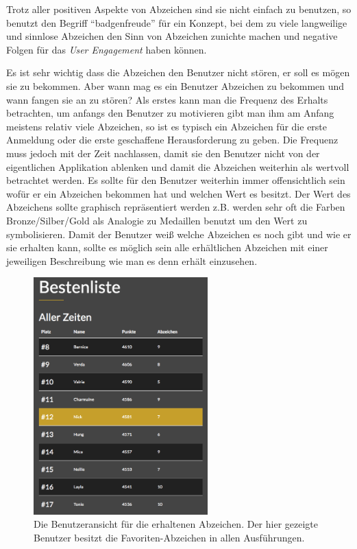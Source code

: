 \documentclass[12pt,twoside]{book}
\begin{document}
Trotz aller positiven Aspekte von Abzeichen sind sie nicht einfach zu benutzen, so benutzt \citep{zichermann2011gamification, 56} den Begriff ``badgenfreude'' für ein Konzept, bei dem zu viele langweilige und sinnlose Abzeichen den Sinn von Abzeichen zunichte machen und negative Folgen für das \textit{User Engagement} haben können.

Es ist sehr wichtig dass die Abzeichen den Benutzer nicht stören, er soll es mögen sie zu bekommen. Aber wann mag es ein Benutzer Abzeichen zu bekommen und wann fangen sie an zu stören?
Als erstes kann man die Frequenz des Erhalts betrachten, um anfangs den Benutzer zu motivieren gibt man ihm am Anfang meistens relativ viele Abzeichen, so ist es typisch ein Abzeichen für die erste Anmeldung oder die erste geschaffene Herausforderung zu geben.
Die Frequenz muss jedoch mit der Zeit nachlassen, damit sie den Benutzer nicht von der eigentlichen Applikation ablenken und damit die Abzeichen weiterhin als wertvoll betrachtet werden.
Es sollte für den Benutzer weiterhin immer offensichtlich sein wofür er ein Abzeichen bekommen hat und welchen Wert es besitzt. Der Wert des Abzeichens sollte graphisch repräsentiert werden z.B. werden sehr oft die Farben Bronze/Silber/Gold als Analogie zu Medaillen benutzt um den Wert zu symbolisieren.
Damit der Benutzer weiß welche Abzeichen es noch gibt und wie er sie erhalten kann, sollte es möglich sein alle erhältlichen Abzeichen mit einer jeweiligen Beschreibung wie man es denn erhält einzusehen.

\begin{figure}[H]
    \centering
    \includegraphics[width=0.6\textwidth]{images/infoboard_leaderboard_user.png}
    \caption{Die Benutzeransicht für die erhaltenen Abzeichen. Der hier gezeigte Benutzer besitzt die Favoriten-Abzeichen in allen Ausführungen.}
    \label{fig:badges}
\end{figure}
\end{document}
